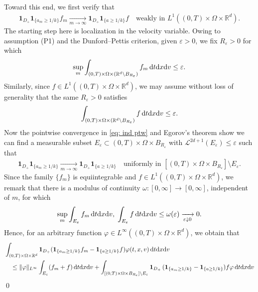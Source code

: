 \documentclass[10pt, reqno]{amsart}
\theoremstyle{plain}
\theoremstyle{definition}
\theoremstyle{remark}
\renewenvironment{proof}[1][\proofname]{\noindent{\scshape #1.\quad}}{\qed}
\numberwithin{equation}{section}
\newcommand{\R}{\mathbb{R}}
\newcommand{\ve}{\varepsilon}
\newcommand{\dx}{\textnormal{d}x}
\newcommand{\dv}{\textnormal{d}v}
\newcommand{\dt}{\textnormal{d}t}
\begin{document}
\begin{proof}[Proof of Proposition \ref{prop: weighted fisher}]
    Toward this end, we first verify that
    \begin{align}\label{eq: prod weak}
        \mathbf{1}_{D_+} \mathbf{1}_{\{a_m\ge 1/k\}} f_m \xrightarrow[m\to\infty]{} \mathbf{1}_{D_+} \mathbf{1}_{\{a\ge 1/k\}} f \quad \text{weakly in }L^1((0,T)\times\Omega\times\R^d).
    \end{align}
    The starting step here is localization in the velocity variable. Owing to assumption (P1) and the Dunford--Pettis criterion, given $\ve>0$, we fix $R_\ve>0$ for which
    \begin{align*}
        \sup_m \int_{(0,T)\times\Omega\times (\R^d\setminus B_{R_\ve})} f_m \,\dt\dx\dv \le \ve.
    \end{align*}
    Similarly, since $f\in L^1((0,T)\times\Omega\times\R^d)$, we may assume without loss of generality that the same $R_\ve>0$ satisfies
    \begin{align*}
        \int_{(0,T)\times\Omega\times (\R^d\setminus B_{R_\ve})} f \,\dt\dx\dv \le \ve.
    \end{align*}
    Now the pointwise convergence in \eqref{eq: ind ptw} and Egorov's theorem show we can find a measurable subset $E_\ve \subset (0,T)\times\Omega\times B_{R_\ve}$ with $\mathscr{L}^{2d+1}(E_\ve)\le \ve$ such that
    \begin{align}\label{eq: ind unif}
        \mathbf{1}_{D_+} \mathbf{1}_{\{a_m\ge 1/k\}} \xrightarrow[m\to\infty]{} \mathbf{1}_{D_+} \mathbf{1}_{\{a \ge 1/k\}} \quad \text{uniformly in }[(0,T)\times\Omega\times B_{R_\ve}]\setminus E_\ve.
    \end{align}
    Since the family $\{f_m\}$ is equiintegrable and $f\in L^1((0,T)\times\Omega\times\R^d)$, we remark that there is a modulus of continuity $\omega:[0,\infty]\to [0,\infty]$, independent of $m$, for which
    \begin{align*}
        \sup_m \int_{E_\ve} f_m \,\dt\dx\dv , \; \int_{E_\ve} f\,\dt\dx\dv \le \omega(\ve) \xrightarrow[\ve\downarrow 0]{} 0 .
    \end{align*}
    Hence, for an arbitrary function $\varphi\in L^\infty((0,T)\times\Omega\times\R^d)$, we obtain that
    \begin{align*}
        &\int_{(0,T)\times\Omega\times\R^d} \mathbf{1}_{D_+} (\mathbf{1}_{\{a_m\ge 1/k\}} f_m - \mathbf{1}_{\{a \ge 1/k \} } f ) \varphi(t,x,v) \,\dt\dx\dv\\
        &\quad \le \|\varphi\|_{L^\infty} \int_{E_\ve} (f_m + f) \,\dt\dx\dv   + \int_{[(0,T)\times\Omega\times B_{R_\ve}]\setminus E_\ve} \mathbf{1}_{D_+} \, (\mathbf{1}_{\{a_m\ge 1/k\}} - \mathbf{1}_{\{a\ge 1/k\}} ) f \varphi \,\dt\dx\dv \\

\end{align*}
\end{proof}
\end{document}
